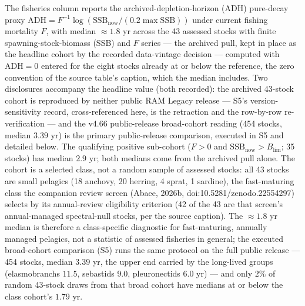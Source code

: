 \documentclass[11pt]{article}
\begin{document}
The fisheries column reports the archived-depletion-horizon (ADH)
pure-decay proxy
\(\mathrm{ADH} = F^{-1}\log(\mathrm{SSB}_{\mathrm{now}}/(0.2\max\mathrm{SSB}))\)
under current fishing mortality \(F\), with median \(\approx 1.8\) yr
across the 43 assessed stocks with finite spawning-stock-biomass (SSB)
and \(F\) series --- the archived pull, kept in place as the headline
cohort by the recorded data-vintage decision --- computed with
\(\mathrm{ADH} = 0\) entered for the eight stocks already at or below
the reference, the zero convention of the source table's caption, which
the median includes. Two disclosures accompany the headline value (both
recorded): the archived 43-stock cohort is reproduced by neither public
RAM Legacy release --- S5's version-sensitivity record, cross-referenced
here, is the retraction and the row-by-row re-verification --- and the
v4.66 public-release broad-cohort reading (454 stocks, median \(3.39\)
yr) is the primary public-release comparison, executed in S5 and
detailed below. The qualifying positive sub-cohort (\(F > 0\) and
\(\mathrm{SSB}_{\mathrm{now}} > B_{\lim}\); 35 stocks) has median
\(2.9\) yr; both medians come from the archived pull alone. The cohort
is a selected class, not a random sample of assessed stocks: all 43
stocks are small pelagics (18 anchovy, 20 herring, 4 sprat, 1 sardine),
the fast-maturing class the companion review screen (Abaee, 2026b, doi:10.5281/zenodo.22554297) selects by its annual-review eligibility criterion (42 of the
43 are that screen's annual-managed spectral-null stocks, per the source
caption). The \(\approx 1.8\) yr median is therefore a class-specific
diagnostic for fast-maturing, annually managed pelagics, not a statistic
of assessed fisheries in general; the executed broad-cohort comparison
(S5) runs the same protocol on the full public release --- 454 stocks,
median \(3.39\) yr, the upper end carried by the long-lived groups
(elasmobranchs \(11.5\), sebastids \(9.0\), pleuronectids \(6.0\) yr)
--- and only \(2\%\) of random 43-stock draws from that broad cohort
have medians at or below the class cohort's \(1.79\) yr.
\end{document}
